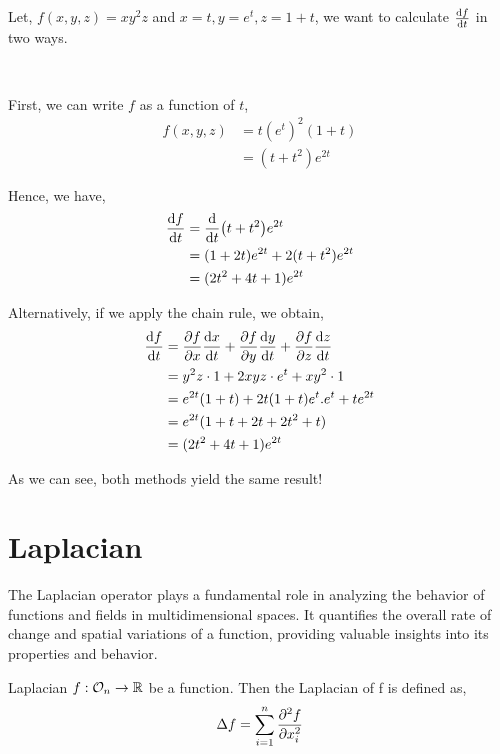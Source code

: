 \documentclass[../Analysis-3.tex]{subfiles}
\begin{document}
\begin{Eg}{}{}
  Let, $f(x,y,z) = xy^{2}z$ and $x=t, y=e^t, z= 1+t$, we want to calculate $\dv{f}{t}$ in two ways.

  \

  First, we can write $f$ as a function of $t$,
  \begin{align*}
    f(x,y,z)
     & = t(e^t)^2(1+t) \\
     & = (t+t^2)e^{2t}
  \end{align*}

  Hence, we have, \begin{align*}
    \dv{f}{t}
     & = \dv{t}(t+t^2)e^{2t}           \\
     & = (1+2t)e^{2t} + 2(t+t^2)e^{2t} \\
     & = (2t^2+4t+1)e^{2t}
  \end{align*}

  Alternatively, if we apply the chain rule, we obtain,
  \begin{align*}
    \dv{f}{t}
     & = \pdv{f}{x} \dv{x}{t} + \pdv{f}{y} \dv{y}{t} + \pdv{f}{z} \dv{z}{t} \\
     & = y^2z\cdot 1 + 2xyz\cdot e^t + xy^2\cdot 1                          \\
     & = e^{2t}(1+t) + 2t(1+t)e^t.e^t + te^{2t}                             \\
     & = e^{2t}(1+t+2t+2t^2+t)                                              \\
     & = (2t^2+4t+1)e^{2t}
  \end{align*}

  As we can see, both methods yield the same result!
\end{Eg}


\section{Laplacian}

The Laplacian operator plays a fundamental role in analyzing the behavior of functions and fields in multidimensional spaces. It quantifies the overall rate of change and spatial variations of a function, providing valuable insights into its properties and behavior.

\begin{Def}{Laplacian}{}
  $f : \mathcal{O}_{n} \to \mathbb{R}$ be a function. Then the Laplacian of f is defined as, \[ \Delta f = \sum_{i = 1}^{n} \pdv[2]{f}{x_i}   \]
\end{Def}
\end{document}
